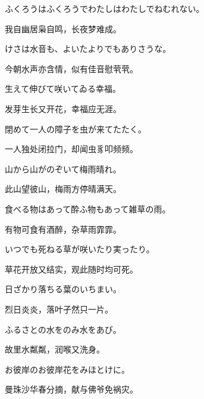 \begin{haiku}
    {\FH ふくろうはふくろうでわたしはわたしでねむれない。}

    {\FK 我自幽居枭自鸣，长夜梦难成。}
\end{haiku}

\begin{haiku}
    {\FH けさは水音も、よいたよりでもありさうな。}

    {\FK 今朝水声亦含情，似有佳音慰茕茕。}
\end{haiku}

\begin{haiku}
    {\FH 生えて伸びて咲いてゐる幸福。}

    {\FK 发芽生长又开花，幸福应无涯。}
\end{haiku}

\begin{haiku}
    {\FH 閉めて一人の障子を虫が来てたたく。}

    {\FK 一人独处闭拉门，却闻虫豸叩频频。}
\end{haiku}

\begin{haiku}
    {\FH 山から山がのぞいて梅雨晴れ。}

    {\FK 此山望彼山，梅雨方停晴满天。}
\end{haiku}

\begin{haiku}
    {\FH 食べる物はあって酔ふ物もあって雑草の雨。}

    {\FK 有物可食有酒醉，杂草雨霏霏。}
\end{haiku}

\begin{haiku}
    {\FH いつでも死ねる草が咲いたり実ったり。}

    {\FK 草花开放又结实，观此随时均可死。}
\end{haiku}

\begin{haiku}
    {\FH 日ざかり落ちる葉のいちまい。}

    {\FK 烈日炎炎，落叶孑然只一片。}
\end{haiku}

\begin{haiku}
    {\FH ふるさとの水をのみ水をあび。}

    {\FK 故里水粼粼，润喉又洗身。}
\end{haiku}

\begin{haiku}
    {\FH お彼岸のお彼岸花をみほとけに。}

    {\FK 曼珠沙华春分摘，献与佛爷免祸灾。}
\end{haiku}

